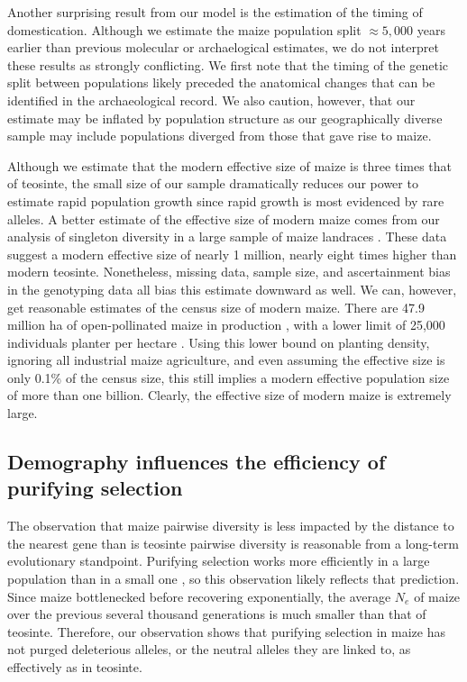 \documentclass{pnastwo}
\begin{document}
\begin{article}
Another surprising result from our model is the estimation of the timing of domestication.
Although we estimate the maize population split $\approx 5,000$ years earlier than previous molecular \cite{matsuoka2002} or archaelogical \cite{piperno2009starch} estimates, we do not interpret these results as strongly conflicting.
We first note that the timing of the genetic split between populations likely preceded the anatomical changes that can be identified in the archaeological record. 
We also caution, however, that our estimate may be inflated by population structure as our geographically diverse sample may include populations diverged from those that gave rise to maize.

Although we estimate that the modern effective size of maize is three times that of teosinte, the small size of our sample dramatically reduces our power to estimate rapid population growth since rapid growth is most evidenced by rare alleles\cite{keinan2012}.  
A better estimate of the effective size of modern maize comes from our analysis of singleton diversity in a large sample of maize landraces \cite{Hearne2015}.
These data suggest a modern effective size of nearly 1 million, nearly eight times higher than modern teosinte.
Nonetheless, missing data, sample size, and ascertainment bias in the genotyping data all bias this estimate downward as well.
We can, however, get reasonable estimates of the census size of modern maize.
There are 47.9 million ha of open-pollinated maize in production \cite{cimmyt1999}, with a lower limit of 25,000 individuals planter per hectare \cite{baden2001culture}.
Using this lower bound on planting density, ignoring all industrial maize agriculture, and even assuming the effective size is only 0.1\% of the census size, this still implies a modern effective population size of more than one billion.
Clearly, the effective size of modern maize is extremely large.

\subsection{Demography influences the efficiency of purifying selection}
The observation that maize pairwise diversity is less impacted by the distance to the nearest gene than is teosinte pairwise diversity is reasonable from a long-term evolutionary standpoint. Purifying selection works more efficiently in a large population than in a small one \cite{kimura1984}, so this observation likely reflects that prediction. Since maize bottlenecked before recovering exponentially, the average $N_e$ of maize over the previous several thousand generations is much smaller than that of teosinte. Therefore, our observation shows that purifying selection in maize has not purged deleterious alleles, or the neutral alleles they are linked to, as effectively as in teosinte.


\end{article}
\end{document}
